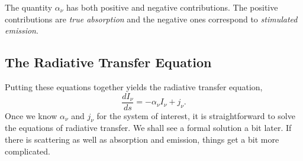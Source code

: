 The quantity $\alpha_\nu$ has both positive and negative
contributions.  The positive contributions are {\em true absorption}  and
the negative ones correspond to {\em stimulated emission}.

\subsection{The Radiative Transfer Equation}
\label{sec:radi-transf-equat}

Putting these equations together yields the radiative transfer equation,
\begin{equation}
\frac{d I_\nu}{ds} = -\alpha_\nu I_\nu + j_\nu.
\label{eq:56}
\end{equation}
Once we know $\alpha_\nu$ and $j_\nu$ for the system of interest, it
is straightforward to solve the equations of radiative transfer.
We shall see a formal solution a bit later.  If there is scattering as
well as absorption and emission, things get a bit more complicated.

